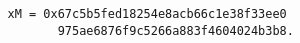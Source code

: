 \begin{verbatim}
                xM = 0x67c5b5fed18254e8acb66c1e38f33ee0
                       975ae6876f9c5266a883f4604024b3b8.
\end{verbatim}
